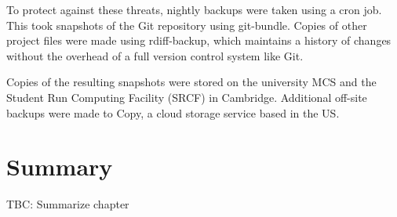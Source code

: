 To protect against these threats, nightly backups were taken using a cron job. This took snapshots of the Git repository using git-bundle. Copies of other project files were made using rdiff-backup, which maintains a history of changes without the overhead of a full version control system like Git.

Copies of the resulting snapshots were stored on the university MCS and the Student Run Computing Facility (SRCF) in Cambridge. Additional off-site backups were made to Copy, a cloud storage service based in the US.


%

\section{Summary}

TBC: Summarize chapter